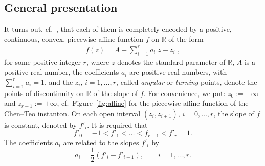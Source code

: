 \documentclass[pdftex]{sigma}
\numberwithin{equation}{section}
\begin{document}
\subsection{General presentation} It turns out, cf.\ \cite[Corollary 5.2]{BG}, that each of them is completely encoded by a positive, continuous, convex, piecewise affine function $f$ on $\mathbb{R}$ of the form
\begin{gather} \label{f} f (z) = A + \sum _{i = 1} ^r a_i |z - z_i|, \end{gather}
for some positive integer $r$, where $z$ denotes the standard parameter of $\mathbb{R}$, $A$ is a positive real number, the coefficients $a _i$ are positive real numbers, with $\sum _{i = 1}^r a_i = 1$, and the $z_i$, $i = 1, \dots, r$, called {\it angular} or {\it turning} points, denote the points of discontinuity on $\mathbb{R}$ of the slope of $f$. For convenience, we put: $z _0 := - \infty$ and $z_{r + 1} := + \infty$, cf.\ Figure~\ref{fig:affine} for the piecewise affine function of the Chen--Teo instanton. On each open interval $(z_i, z_{i + 1})$, $i = 0, \dots, r$, the slope of $f$ is constant, denoted by $f' _i$. It is required that
\[
 f'_0 = - 1 < f'_1 < \dots < f _{r-1} < f'_r = 1.
 \]
The coefficients $a_i$ are related to the slopes $f'_i$ by
\[ a _i = \frac{1}{2} (f'_i - f'_{i - 1}), \qquad i = 1, \dots, r.\]
\end{document}
